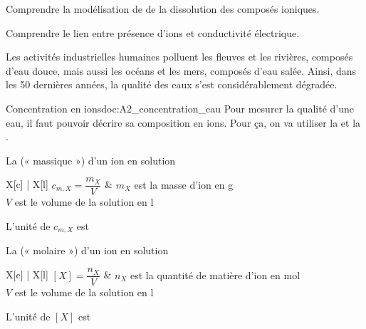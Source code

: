 \teteTermStssEnvi

\vspace*{-36pt}


\begin{objectifs}
  \item Comprendre la modélisation de de la dissolution des composés ioniques.
  \item Comprendre le lien entre présence d'ions et conductivité électrique.
\end{objectifs}

\begin{contexte}
  Les activités industrielles humaines polluent les fleuves et les rivières, composés d'eau douce, mais aussi les océans et les mers, composés d'eau salée.
  Ainsi, dans les 50 dernières années, la qualité des eaux s'est considérablement dégradée.
  
\end{contexte}


\begin{doc}{Concentration en ions}{doc:A2_concentration_eau}
  Pour mesurer la qualité d'une eau, il faut pouvoir décrire sa composition en ions.
  Pour ça, on va utiliser la 
  et la .

  \begin{encart}  
    La  (« massique ») d'un ion en solution
    \begin{center}
      \begin{tblr}{X[c] | X[l]}
        $c_{m,X} = \dfrac{m_X}{V}$ &
        { $m_X$ est la masse d'ion en \unit{\g} \\
        $V$ est le volume de la solution en \unit{\litre} }
      \end{tblr}
    \end{center}
    L'unité de $c_{m,X}$ est \texteTrou[0.1]{\unit{\g\per\litre}}
  \end{encart}
  \begin{encart}  
    La  (« molaire ») d'un ion en solution
    \begin{center}
      \begin{tblr}{X[c] | X[l]}
        $[X] = \dfrac{n_X}{V}$ &
        { $n_X$ est la quantité de matière d'ion en \unit{\mole} \\
        $V$ est le volume de la solution en \unit{\litre} }
      \end{tblr}
    \end{center}
    L'unité de $[X]$ est \texteTrou[0.1]{\unit{\mole\per\litre}}
  \end{encart}
\end{doc}

